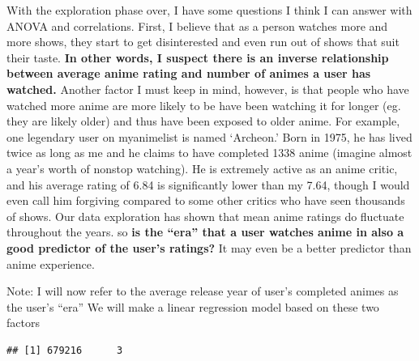 \documentclass[
]{article}
\newenvironment{Shaded}{\begin{snugshade}}{\end{snugshade}}
\newcommand{\CommentTok}[1]{\textcolor[rgb]{0.56,0.35,0.01}{\textit{#1}}}
\newcommand{\DecValTok}[1]{\textcolor[rgb]{0.00,0.00,0.81}{#1}}
\newcommand{\FunctionTok}[1]{\textcolor[rgb]{0.00,0.00,0.00}{#1}}
\newcommand{\NormalTok}[1]{#1}
\newcommand{\OtherTok}[1]{\textcolor[rgb]{0.56,0.35,0.01}{#1}}
\newcommand{\SpecialCharTok}[1]{\textcolor[rgb]{0.00,0.00,0.00}{#1}}
\newcommand{\StringTok}[1]{\textcolor[rgb]{0.31,0.60,0.02}{#1}}
\begin{document}
With the exploration phase over, I have some questions I think I can
answer with ANOVA and correlations. First, I believe that as a person
watches more and more shows, they start to get disinterested and even
run out of shows that suit their taste. \textbf{In other words, I
suspect there is an inverse relationship between average anime rating
and number of animes a user has watched.} Another factor I must keep in
mind, however, is that people who have watched more anime are more
likely to be have been watching it for longer (eg. they are likely
older) and thus have been exposed to older anime. For example, one
legendary user on myanimelist is named `Archeon.' Born in 1975, he has
lived twice as long as me and he claims to have completed 1338 anime
(imagine almost a year's worth of nonstop watching). He is extremely
active as an anime critic, and his average rating of 6.84 is
significantly lower than my 7.64, though I would even call him forgiving
compared to some other critics who have seen thousands of shows. Our
data exploration has shown that mean anime ratings do fluctuate
throughout the years. so \textbf{is the ``era'' that a user watches
anime in also a good predictor of the user's ratings?} It may even be a
better predictor than anime experience.

Note: I will now refer to the average release year of user's completed
animes as the user's ``era'' We will make a linear regression model
based on these two factors

\begin{Shaded}
\end{Shaded}

\begin{verbatim}
## [1] 679216      3
\end{verbatim}
\end{document}
